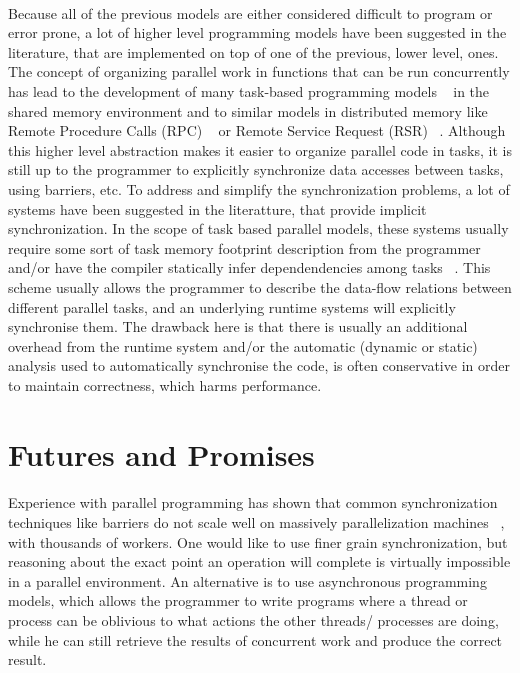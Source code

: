 \paragraph{}
Because all of the previous models are either considered difficult to program or error prone, a lot of higher 
level programming models have been suggested in the literature, that are implemented on top of one of the 
previous, lower level, ones.  The concept of organizing parallel work in functions that can be run
concurrently has lead to the development of many task-based programming models
~\cite{Ayguade:2009:DOT:1512157.1512430, Blumofe95cilk:an} in the shared memory
environment and to similar models in distributed memory like Remote Procedure Calls (RPC)
~\cite{Saunders:2003:AAP:966049.781534,Beckman96tulip:a,Vadhiyar03gradsolve-}
or Remote Service Request (RSR) ~\cite{Foster96thenexus}.  Although this higher level
abstraction makes it easier to organize parallel code in tasks, it is still up to the 
programmer to explicitly synchronize data accesses between tasks, using barriers, etc.
To address and simplify the synchronization problems, a lot of systems have been suggested
in the literatture, that provide implicit synchronization.  In the scope of task based parallel
models, these systems usually require some sort of task memory footprint description from the 
programmer~\cite{Tzenakis:2012:BBD:2370036.2145864, Perez:2010:HTD:1810085.1810122}
and/or have the compiler statically infer dependendencies among tasks 
~\cite{Jenista:2011:OSO:1941553.1941563, Zakkak:2012:IDI:2370816.2370892}.
This scheme usually allows the programmer to describe the data-flow relations between different
parallel tasks, and an underlying runtime systems will explicitly synchronise them.  The drawback
here is that there is usually an additional overhead from the runtime system and/or the automatic
(dynamic or static) analysis used to automatically synchronise the code, is often conservative
in order to maintain correctness, which harms performance.

\section{Futures and Promises}
\label{sect:futures-promises}

\paragraph{}
Experience with parallel programming has shown that common synchronization techniques like
barriers do not scale well on massively parallelization machines ~\cite{4100352}, with thousands of workers.
One would like to use finer grain synchronization, but reasoning about the exact point an operation will complete
is virtually impossible in a parallel environment.  An alternative is to use asynchronous programming models, which
allows the programmer to write programs where a thread or process can be oblivious to what actions the other threads/
processes are doing, while he can still retrieve the results of concurrent work and produce the correct result.

